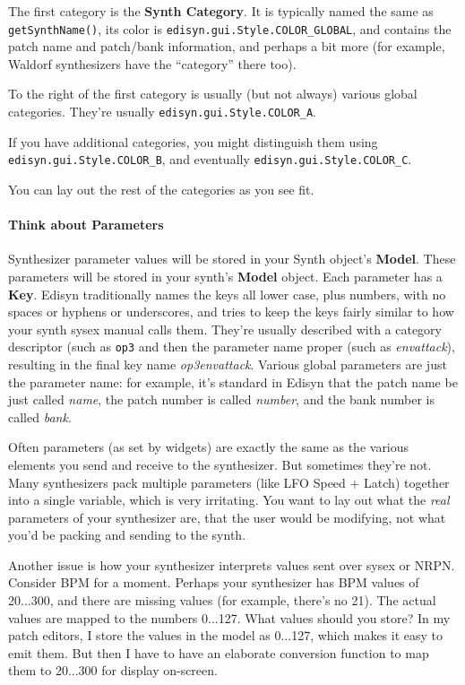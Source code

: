 \documentclass{article}
\begin{document}
The first category is the {\bf Synth Category}.  It is typically named the same as {\tt getSynthName()}, its color is {\tt edisyn.gui.Style.COLOR\_GLOBAL}, and contains the patch name and patch/bank information, and perhaps a bit more (for example, Waldorf synthesizers have the ``category'' there too).

To the right of the first category is usually (but not always) various global categories.  They're usually {\tt edisyn.gui.Style.COLOR\_A}.

If you have additional categories, you might distinguish them using {\tt edisyn.gui.Style.COLOR\_B}, and eventually {\tt edisyn.gui.Style.COLOR\_C}.

You can lay out the rest of the categories as you see fit.

\paragraph{Think about Parameters}

Synthesizer parameter values will be stored in your Synth object's {\bf Model}.  These parameters will be stored in your synth's {\bf Model} object.  Each parameter has a {\bf Key}.  Edisyn traditionally names the keys all lower case, plus numbers, with no spaces or hyphens or underscores, and tries to keep the keys fairly similar to how your synth sysex manual calls them.  They're usually described with a category descriptor (such as {\tt op3} and then the parameter name proper (such as {\it envattack}), resulting in the final key name {\it op3envattack}.  Various global parameters are just the parameter name: for example, it's standard in Edisyn that the patch name be just called {\it name}, the patch number is called {\it number}, and the bank number is called {\it bank}.

Often parameters (as set by widgets) are exactly the same as the various elements you send and receive to the synthesizer.  But sometimes they're not.  Many synthesizers pack multiple parameters (like LFO Speed \(+\) Latch) together into a single variable, which is very irritating.  You want to lay out what the {\it real} parameters of your synthesizer are, that the user would be modifying, not what you'd be packing and sending to the synth.

Another issue is how your synthesizer interprets values sent over sysex or NRPN.  Consider BPM for a moment.  Perhaps your synthesizer has BPM values of 20...300, and there are missing values (for example, there's no 21).  The actual values are mapped to the numbers 0...127.  What values should you store?  In my patch editors, I store the values in the model as 0...127, which makes it easy to emit them.  But then I have to have an elaborate conversion function to map them to 20...300 for display on-screen.
\end{document}
